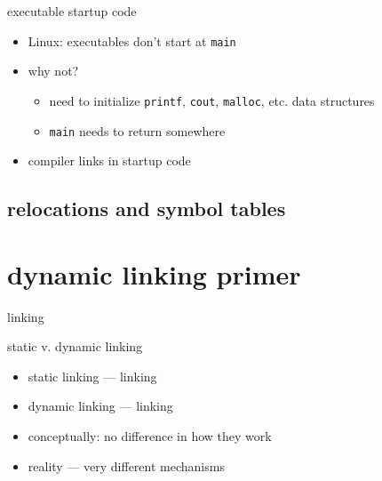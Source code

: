 \begin{frame}{executable startup code}
    \begin{itemize}
    \item Linux: executables don't start at {\tt main}
    \item why not?
        \begin{itemize}
        \item need to initialize {\tt printf}, {\tt cout}, {\tt malloc}, etc. data structures
        \item {\tt main} needs to return somewhere
        \end{itemize}
    \item compiler links in startup code
    \end{itemize}
\end{frame}

\subsection{relocations and symbol tables}

\section{dynamic linking primer}

\begin{frame}{linking}
\end{frame}

\begin{frame}{static v. dynamic linking}
    \begin{itemize}
    \item static linking --- linking 
    \item dynamic linking --- linking 
    \vspace{.5cm}
    \item<2> conceptually: no difference in how they work
    \item<2> reality --- very different mechanisms
    \end{itemize}
\end{frame}

